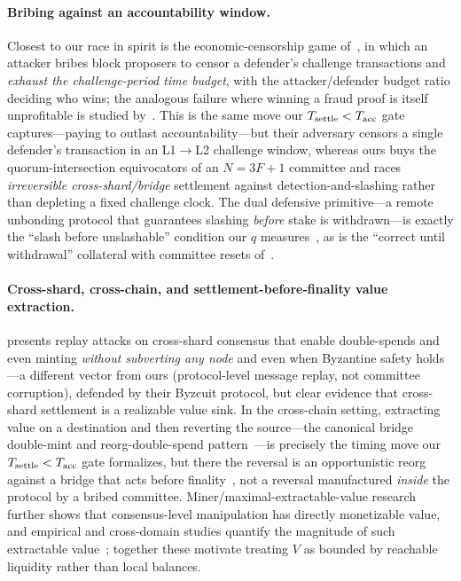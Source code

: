 \paragraph{Bribing against an accountability window.}
Closest to our race in spirit is the economic-censorship game of~\cite{berger2025censorship}, in which
an attacker bribes block proposers to censor a defender's challenge transactions and \emph{exhaust the
challenge-period time budget}, with the attacker/defender budget ratio deciding who wins; the
analogous failure where winning a fraud proof is itself unprofitable is studied
by~\cite{lee2025hollow}. This is the same move our $T_{\mathrm{settle}}<T_{\mathrm{acc}}$ gate captures---paying to outlast
accountability---but their adversary censors a single defender's transaction in an
L1$\rightarrow$L2 challenge window, whereas ours buys the quorum-intersection equivocators of an
$N{=}3F{+}1$ committee and races \emph{irreversible cross-shard/bridge} settlement against
detection-and-slashing rather than depleting a fixed challenge clock. The dual defensive
primitive---a remote unbonding protocol that guarantees slashing \emph{before} stake is
withdrawn---is exactly the ``slash before unslashable'' condition our $q$
measures~\cite{dong2024remotestaking}, as is the ``correct until withdrawal'' collateral with
committee resets of~\cite{baron2025aegis}.

\paragraph{Cross-shard, cross-chain, and settlement-before-finality value extraction.}
\cite{sonnino2020replay} presents replay attacks on cross-shard consensus that enable double-spends
and even minting \emph{without subverting any node} and even when Byzantine safety holds---a
different vector from ours (protocol-level message replay, not committee corruption), defended by
their Byzcuit protocol, but clear evidence that cross-shard settlement is a realizable value sink. In
the cross-chain setting, extracting value on a destination and then reverting the source---the
canonical bridge double-mint and reorg-double-spend pattern~\cite{zamyatin2021sok,lee2022sokbridge}---is
precisely the timing move our $T_{\mathrm{settle}}<T_{\mathrm{acc}}$ gate formalizes, but there the reversal is an
opportunistic reorg against a bridge that acts before finality~\cite{schwarzschilling2022three}, not a
reversal manufactured \emph{inside} the protocol by a bribed committee. Miner/maximal-extractable-value
research~\cite{daian2020flashboys} further shows that consensus-level manipulation has directly
monetizable value, and empirical and cross-domain studies quantify the magnitude of such extractable
value~\cite{qin2022quantifying,mcmenamin2023sok}; together these motivate treating $V$ as bounded by
reachable liquidity rather than local balances.

